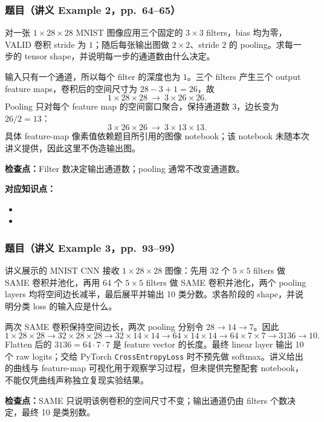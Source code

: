 \subsubsection*{题目（讲义 Example 2，pp.~64--65）}

对一张 $1\times28\times28$ MNIST 图像应用三个固定的 $3\times3$ filters，bias 均为零，VALID 卷积 stride 为 $1$；随后每张输出图做 $2\times2$、stride $2$ 的 pooling。求每一步的 tensor shape，并说明每一步的通道数由什么决定。

\begin{workedsolution}
输入只有一个通道，所以每个 filter 的深度也为 $1$。三个 filters 产生三个 output feature maps，卷积后的空间尺寸为 $28-3+1=26$，故
\[
  \boxed{1\times28\times28\ \longrightarrow\ 3\times26\times26}.
\]
Pooling 只对每个 feature map 的空间窗口聚合，保持通道数 $3$，边长变为 $26/2=13$：
\[
  \boxed{3\times26\times26\ \longrightarrow\ 3\times13\times13}.
\]
具体 feature-map 像素值依赖题目所引用的图像 notebook；该 notebook 未随本次讲义提供，因此这里不伪造输出图。
\end{workedsolution}

\textbf{检查点：}Filter 数决定输出通道数；pooling 通常不改变通道数。


\textbf{对应知识点：}
\begin{itemize}
  \item {}
  \item {}
\end{itemize}

\subsubsection*{题目（讲义 Example 3，pp.~93--99）}

讲义展示的 MNIST CNN 接收 $1\times28\times28$ 图像：先用 32 个 $5\times5$ filters 做 SAME 卷积并池化，再用 64 个 $5\times5$ filters 做 SAME 卷积并池化，两个 pooling layers 均将空间边长减半，最后展平并输出 10 类分数。求各阶段的 shape，并说明分类 loss 的输入应是什么。

\begin{workedsolution}
两次 SAME 卷积保持空间边长，两次 pooling 分别令 $28\to14\to7$。因此
\[
\boxed{
1\times28\times28
\to32\times28\times28
\to32\times14\times14
\to64\times14\times14
\to64\times7\times7
\to3136
\to10}.
\]
Flatten 后的 $3136=64\cdot7\cdot7$ 是 feature vector 的长度。最终 linear layer 输出 10 个 raw logits；交给 PyTorch \texttt{CrossEntropyLoss} 时不预先做 softmax。讲义给出的曲线与 feature-map 可视化用于观察学习过程，但未提供完整配套 notebook，不能仅凭曲线声称独立复现实验结果。
\end{workedsolution}

\textbf{检查点：}SAME 只说明该例卷积的空间尺寸不变；输出通道仍由 filters 个数决定，最终 10 是类别数。
